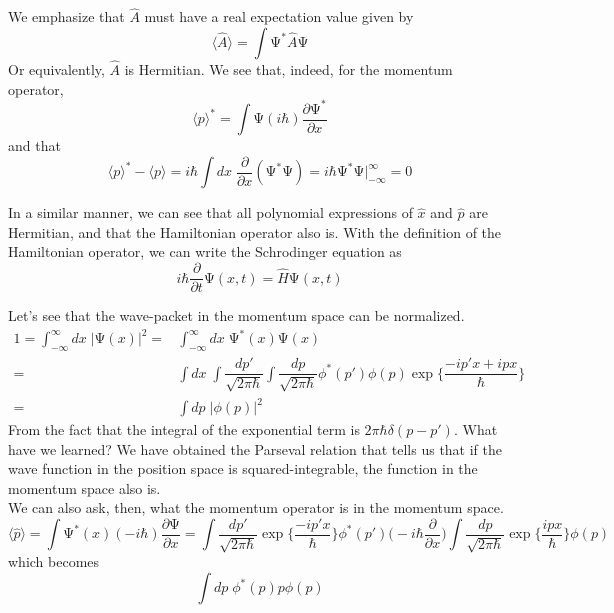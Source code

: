 \vspace{2ex}
\begin{rmk}
We emphasize that $\hat{A}$ must have a real expectation value given by
\[\langle \hat{A}\rangle =\int \mathrm{\Psi} ^{*}\hat{A}\mathrm{\Psi} \]
Or equivalently, $\hat{A}$ is Hermitian. We see that, indeed, for the momentum operator, 
\[\langle p\rangle ^{*}=\int \mathrm{\Psi} (i\hbar )\dfrac{\partial \mathrm{\Psi} ^{*}}{\partial x} \]
and that
\[\langle p\rangle ^{*}-\langle p\rangle =i\hbar \int dx\;\dfrac{\partial }{\partial x}(\mathrm{\Psi} ^{*}\mathrm{\Psi} )=i\hbar \mathrm{\Psi} ^{*}\mathrm{\Psi} \Big|^{\infty }_{-\infty } =0\]
\end{rmk}
In a similar manner, we can see that all polynomial expressions of $\hat{x}$ and $\hat{p}$ are Hermitian, and that the Hamiltonian operator also is. With the definition of the Hamiltonian operator, we can write the Schrodinger equation as
\[i\hbar \dfrac{\partial }{\partial t}\mathrm{\Psi} (x,t)=\hat{H}\mathrm{\Psi} (x,t) \]
\vspace{2ex}
\begin{rmk}
Let's see that the wave-packet in the momentum space can be normalized.
\begin{align*}
1=	\int _{-\infty }^{\infty }dx\;|\mathrm{\Psi} (x)|^2=&\int ^{\infty }_{-\infty }dx\;\mathrm{\Psi} ^{*}(x)\mathrm{\Psi} (x)\\
	=&\int dx\;\int \dfrac{dp'}{\sqrt{2\pi \hbar }}\int \dfrac{dp}{\sqrt{2\pi \hbar }}\phi ^{*}(p')\phi (p)\exp \Big\{\dfrac{-ip'x+ipx}{\hbar }\Big\}\\
	=&\int dp\;|\phi (p)|^2
\end{align*}
From the fact that the integral of the exponential term is
$2\pi \hbar \delta (p-p')$.
What have we learned? We have obtained the Parseval relation that tells us that if the wave function in the position space is squared-integrable, the function in the momentum space also is.
\\
We can also ask, then, what the momentum operator is in the momentum space.
\[\langle \hat{p}\rangle =\int \mathrm{\Psi} ^{*}(x)(-i\hbar )\dfrac{\partial \mathrm{\Psi} }{\partial x}=\int \dfrac{dp'}{\sqrt{2\pi \hbar }}\exp \Big\{\dfrac{-ip'x}{\hbar }\Big\}\phi ^{*}(p')\Big(-i\hbar \dfrac{\partial }{\partial x} \Big)\int \dfrac{dp}{\sqrt{2\pi \hbar }}\exp \Big\{\dfrac{ipx}{\hbar }\Big\}\phi (p)\]
which becomes
\[\int dp\;\phi ^{*}(p)p\phi (p)\]

\end{rmk}
\vspace{2ex}

